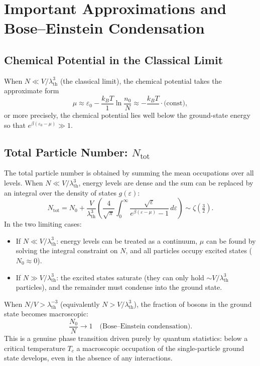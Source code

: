 \section{Important Approximations and Bose--Einstein Condensation}

\subsection{Chemical Potential in the Classical Limit}

When $N \ll V/\lambda_{\text{th}}^3$ (the classical limit), the chemical potential takes the approximate form
\begin{equation}
    \mu \approx \varepsilon_0 - \frac{k_BT}{1} \ln\frac{n_0}{N} \approx -\frac{k_BT}{\phantom{1}} \cdot \text{(const)},
\end{equation}
or more precisely, the chemical potential lies well below the ground-state energy so that $e^{\beta(\varepsilon_0 - \mu)} \gg 1$.

\subsection{Total Particle Number: $N_{\text{tot}}$}

The total particle number is obtained by summing the mean occupations over all levels. When $N \ll V/\lambda_{\text{th}}^3$, energy levels are dense and the sum can be replaced by an integral over the density of states $g(\varepsilon)$:
\begin{equation}
    N_{\text{tot}} = N_0 + \frac{V}{\lambda_{\text{th}}^3}\left(\frac{4}{\sqrt{\pi}}\int_0^\infty \frac{\sqrt{\varepsilon}}{e^{\beta(\varepsilon-\mu)}-1}\,d\varepsilon\right) \sim \zeta\!\left(\tfrac{3}{2}\right).
\end{equation}
In the two limiting cases:
\begin{itemize}
    \item If $N \ll V/\lambda_{\text{th}}^3$: energy levels can be treated as a continuum, $\mu$ can be found by solving the integral constraint on $N$, and all particles occupy excited states ($N_0 \approx 0$).
    \item If $N \gg V/\lambda_{\text{th}}^3$: the excited states saturate (they can only hold $\sim V/\lambda_{\text{th}}^3$ particles), and the remainder must condense into the ground state.
\end{itemize}

\begin{fact}
When $N/V > \lambda_{\text{th}}^{-3}$ (equivalently $N > V/\lambda_{\text{th}}^3$), the fraction of bosons in the ground state becomes macroscopic:
\begin{equation}
    \frac{N_0}{N} \to 1 \quad \text{(Bose--Einstein condensation)}.
\end{equation}
This is a genuine phase transition driven purely by quantum statistics: below a critical temperature $T_c$ a macroscopic occupation of the single-particle ground state develops, even in the absence of any interactions.
\end{fact}
